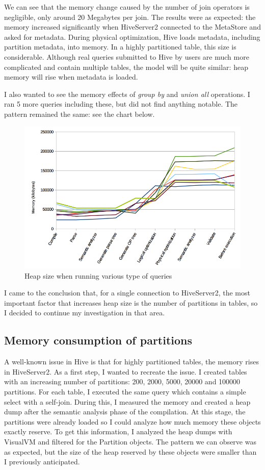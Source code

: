 We can see that the memory change caused by the number of join operators is negligible, only around 20 Megabytes per join. The results were as expected: the memory increased significantly when HiveServer2 connected to the MetaStore and asked for metadata. During physical optimization, Hive loads metadata, including partition metadata, into memory. In a highly partitioned table, this size is considerable. Although real queries submitted to Hive by users are much more complicated and contain multiple tables, the model will be quite similar: heap memory will rise when metadata is loaded.

I also wanted to see the memory effects of \textit{group by} and  \textit{union all} operations. I ran 5 more queries including these, but did not find anything notable. The pattern remained the same: see the chart below. 

\begin{figure}[H]
	\includegraphics[width=150mm, keepaspectratio]{figures/hs2_memory.png}
	\centering
	\caption{Heap size when running various type of queries}
\end{figure}

I came to the conclusion that, for a single connection to HiveServer2, the most important factor that increases heap size is the number of partitions in tables, so I decided to continue my investigation in that area. 

\subsection{Memory consumption of partitions}
A well-known issue in Hive is that for highly partitioned tables, the memory rises in HiveServer2. As a first step, I wanted to recreate the issue. I created tables with an increasing number of partitions: 200, 2000, 5000, 20000 and 100000 partitions. For each table, I executed the same query which contains a simple select with a self-join. During this, I measured the memory and created a heap dump after the semantic analysis phase of the compilation. At this stage, the partitions were already loaded so I could analyze how much memory these objects exactly reserve. To get this information, I analyzed the heap dumps with VisualVM and filtered for the Partition objects. The pattern we can observe was as expected, but the size of the heap reserved by these objects were smaller than I previously anticipated.

